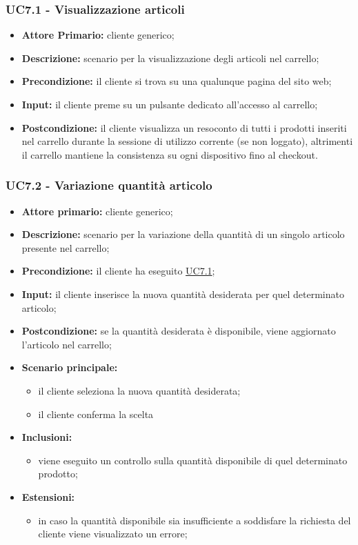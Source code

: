 \subsubsection{UC7.1 - Visualizzazione articoli}
\label{UC7.1}
\begin{itemize}
    \item \textbf{Attore Primario:} cliente generico;
    \item \textbf{Descrizione:} scenario per la visualizzazione degli articoli nel carrello;
    \item \textbf{Precondizione:} il cliente si trova su una qualunque pagina del sito web;
    \item \textbf{Input:} il cliente preme su un pulsante dedicato all'accesso al carrello;
    \item \textbf{Postcondizione:} il cliente visualizza un resoconto di tutti i prodotti inseriti nel carrello durante
                                   la sessione di utilizzo corrente (se non loggato), altrimenti il carrello mantiene la consistenza
                                   su ogni dispositivo fino al checkout.
\end{itemize}

\subsubsection{UC7.2 - Variazione quantità articolo}
\label{UC7.2}
\begin{itemize}
    \item \textbf{Attore primario:} cliente generico;
    \item \textbf{Descrizione:} scenario per la variazione della quantità di un singolo articolo presente nel carrello;
    \item \textbf{Precondizione:} il cliente ha eseguito \hyperref[UC7.1]{UC7.1};
    \item \textbf{Input:} il cliente inserisce la nuova quantità desiderata per quel determinato articolo;
    \item \textbf{Postcondizione:} se la quantità desiderata è disponibile, viene aggiornato l'articolo nel carrello;
    \item \textbf{Scenario principale:}
    \begin{itemize}
        \item il cliente seleziona la nuova quantità desiderata;
        \item il cliente conferma la scelta
    \end{itemize}
    \item \textbf{Inclusioni:}
    \begin{itemize}
        \item viene eseguito un controllo sulla quantità disponibile di quel determinato prodotto;
    \end{itemize}
    \item \textbf{Estensioni:}
    \begin{itemize}
        \item in caso la quantità disponibile sia insufficiente a soddisfare la richiesta del cliente viene visualizzato un errore;
    \end{itemize}
\end{itemize}

